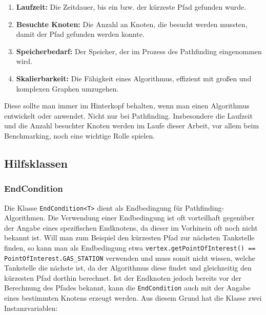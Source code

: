             \begin{enumerate}
                \item \textbf{Laufzeit:} Die Zeitdauer, bis ein bzw. der kürzeste Pfad gefunden wurde.

                \item \textbf{Besuchte Knoten:} Die Anzahl an Knoten, die besucht werden mussten, damit der Pfad gefunden werden konnte. 
        
                \item \textbf{Speicherbedarf:} Der Speicher, der im Prozess des Pathfinding eingenommen wird.
    
                \item \textbf{Skalierbarkeit:} Die Fähigkeit eines Algorithmus, effizient mit großen und komplexen Graphen umzugehen.
            \end{enumerate}

            Diese sollte man immer im Hinterkopf behalten, wenn man einen Algorithmus entwickelt oder anwendet. Nicht nur bei Pathfinding. Insbesondere die Laufzeit und die Anzahl besuchter Knoten werden im Laufe dieser Arbeit, vor allem beim Benchmarking, noch eine wichtige Rolle spielen.

        \subsection{Hilfsklassen}
        
            \subsubsection{EndCondition}

                Die Klasse \lstinline{EndCondition<T>} dient als Endbedingung für Pathfinding-Algorithmen. Die Verwendung einer Endbedingung ist oft vorteilhaft gegenüber der Angabe eines spezifischen Endknotens, da dieser im Vorhinein oft noch nicht bekannt ist. Will man zum Beispiel den kürzesten Pfad zur nächsten Tankstelle finden, so kann man als Endbedingung etwa \lstinline{vertex.getPointOfInterest() == PointOfInterest.GAS_STATION} verwenden und muss somit nicht wissen, welche Tankstelle die nächste ist, da der Algorithmus diese findet und gleichzeitig den kürzesten Pfad dorthin berechnet. Ist der Endknoten jedoch bereits vor der Berechnung des Pfades bekannt, kann die \lstinline{EndCondition} auch mit der Angabe eines bestimmten Knotens erzeugt werden. Aus diesem Grund hat die Klasse zwei Instanzvariablen:

